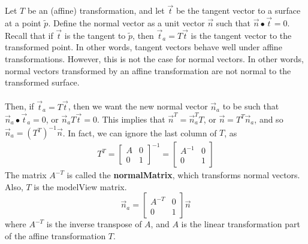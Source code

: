 \documentclass[letterpaper,12pt]{article}
\begin{document}
Let $T$ be an (affine) transformation, and let $\vec{t}$ be the tangent vector to a surface at a point $\tilde{p}$. Define the normal vector as a unit vector $\vec{n}$ such that $\vec{n} \bullet \vec{t} = 0$. Recall that if $\vec{t}$ is the tangent to $\tilde{p}$, then $\vec{t}_a = T \vec{t}$ is the tangent vector to the transformed point. In other words, tangent vectors behave well under affine transformations. However, this is not the case for normal vectors. In other words, normal vectors transformed by an affine transformation are not normal to the transformed surface.
\\ \\ Then, if $\vec{t}_a = T \vec{t}$, then we want the new normal vector $\vec{n}_a$ to be such that $\vec{n}_a \bullet \vec{t}_a = 0$, or $\vec{n}_a T \vec{t} = 0$. This implies that $\vec{n}^T = \vec{n}_a^T T$, or $\vec{n} = T^T \vec{n}_a$, and so $\vec{n}_a = (T^T)^{-1} \vec{n}$. In fact, we can ignore the last column of $T$, as
\begin{align*}
    T^T = \begin{bmatrix} A & 0 \\ 0 & 1 \end{bmatrix}^{-1} = \begin{bmatrix} A^{-1} & 0 \\ 0 & 1 \end{bmatrix}
\end{align*}
The matrix $A^{-T}$ is called the \textbf{normalMatrix}, which transforms normal vectors. Also, $T$ is the modelView matrix.
\begin{equation*}
    \boxed{\vec{n}_a = \begin{bmatrix} A^{-T} & 0 \\ 0 & 1 \end{bmatrix} \vec{n}}
\end{equation*}
where $A^{-T}$ is the inverse transpose of $A$, and $A$ is the linear transformation part of the affine transformation $T$.
\end{document}
